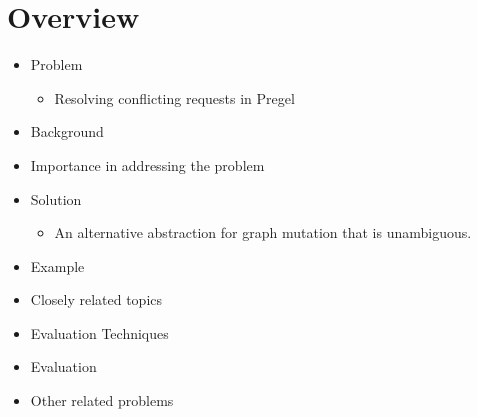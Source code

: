 \section{Overview}

\begin{frame}
\begin{itemize}
  \item Problem
  \begin{itemize}
    \item Resolving conflicting requests in Pregel
  \end{itemize}  
  \item Background
  \item Importance in addressing the problem
   \item Solution
  \begin{itemize}
    \item An alternative abstraction for graph mutation that is unambiguous.
  \end{itemize}

  \item Example
  \item Closely related topics
  \item Evaluation Techniques
  \item Evaluation
  \item Other related problems
\end{itemize}
\end{frame}
